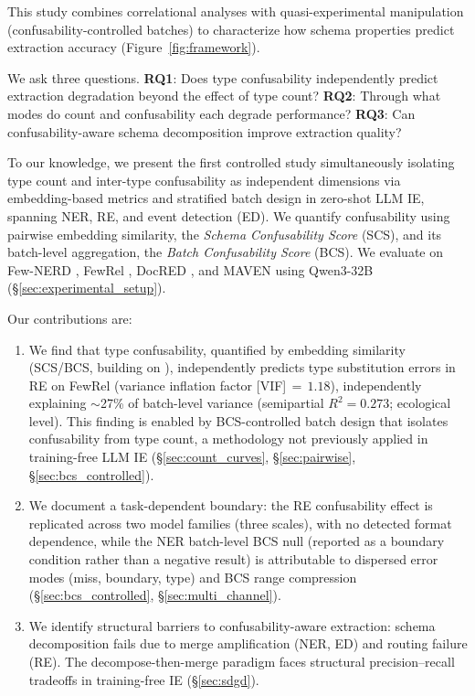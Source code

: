 This study combines correlational analyses with quasi-experimental manipulation (confusability-controlled batches) to characterize how schema properties predict extraction accuracy (Figure~\ref{fig:framework}).

We ask three questions. \textbf{RQ1}: Does type confusability independently predict extraction degradation beyond the effect of type count? \textbf{RQ2}: Through what modes do count and confusability each degrade performance? \textbf{RQ3}: Can confusability-aware schema decomposition improve extraction quality?

To our knowledge, we present the first controlled study simultaneously isolating type count and inter-type confusability as independent dimensions via embedding-based metrics and stratified batch design in zero-shot LLM IE, spanning NER, RE, and event detection (ED). We quantify confusability using pairwise embedding similarity, the \emph{Schema Confusability Score} (SCS), and its batch-level aggregation, the \emph{Batch Confusability Score} (BCS). We evaluate on Few-NERD \citep{fewnerd-2021}, FewRel \citep{fewrel-2018}, DocRED \citep{docred-2019}, and MAVEN \citep{maven-2020} using Qwen3-32B (\S\ref{sec:experimental_setup}).

Our contributions are:
\begin{enumerate}[leftmargin=*,itemsep=2pt,topsep=2pt]
    \item We find that type confusability, quantified by embedding similarity (SCS/BCS, building on \citealt{llm-pee-2025}), independently predicts type substitution errors in RE on FewRel (variance inflation factor [VIF]${}\,=\,1.18$), independently explaining ${\sim}$27\% of batch-level variance (semipartial $R^2 = 0.273$; ecological level). This finding is enabled by BCS-controlled batch design that isolates confusability from type count, a methodology not previously applied in training-free LLM IE (\S\ref{sec:count_curves}, \S\ref{sec:pairwise}, \S\ref{sec:bcs_controlled}).
    \item We document a task-dependent boundary: the RE confusability effect is replicated across two model families (three scales), with no detected format dependence, while the NER batch-level BCS null (reported as a boundary condition rather than a negative result) is attributable to dispersed error modes (miss, boundary, type) and BCS range compression (\S\ref{sec:bcs_controlled}, \S\ref{sec:multi_channel}).
    \item We identify structural barriers to confusability-aware extraction: schema decomposition fails due to merge amplification (NER, ED) and routing failure (RE). The decompose-then-merge paradigm faces structural precision--recall tradeoffs in training-free IE (\S\ref{sec:sdgd}).
\end{enumerate}

